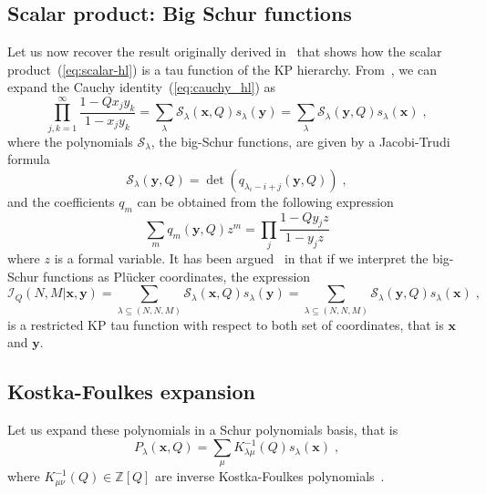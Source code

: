 \documentclass[a4paper,11pt]{amsart}
\begin{document}

\subsection{Scalar product: Big Schur functions}

Let us now recover the result originally derived
in~\cite{Foda:2008hn} that shows how the scalar
product~(\ref{eq:scalar-hl}) is a tau function of the KP hierarchy.
From~\cite[see chap.3, sec. 4, eq. (4.7)]{Macdonald:1998}, we can
expand the Cauchy identity~(\ref{eq:cauchy_hl}) as
\begin{equation}
 \prod_{j, k=1}^\infty \frac{1-Q x_j y_k}{1 - x_j y_k} = 
\sum_{\lambda} \mathcal{S}_{\lambda}(\bm{x}, Q) s_{\lambda}(\bm{y}) =
\sum_{\lambda} \mathcal{S}_{\lambda}(\bm{y}, Q) s_{\lambda}(\bm{x}) \; ,
\end{equation}
where the polynomials \(\mathcal{S}_\lambda\), the big-Schur
functions, are given by a Jacobi-Trudi formula
\begin{equation}
  \mathcal{S}_{\lambda} (\bm{y}, Q) = \det(q_{\lambda_i -i + j}(\bm{y}, Q))\; , 
\end{equation}
and the coefficients \(q_m\) can be obtained from the following expression
\begin{equation}
 \sum_{m} q_m(\bm{y}, Q) z^m =
 \prod_{j} \frac{1-Q y_j z}{1 - y_j z}
\end{equation}
where \(z\) is a formal variable. It has been
argued~\cite{Foda:2008hn} in that if we interpret the big-Schur
functions as Plücker coordinates, the expression
\begin{equation}
  \mathcal{I}_Q(N,M | \bm{x}, \bm{y})
  = \sum_{\lambda \subseteq (N,N,M)} \mathcal{S}_{\lambda}(\bm{x}, Q) s_{\lambda}(\bm{y})
  = \sum_{\lambda \subseteq (N,N,M)} \mathcal{S}_{\lambda}(\bm{y}, Q) s_{\lambda}(\bm{x})\; ,
\end{equation}
is a restricted KP tau function with respect to both set of coordinates,
that is \(\bm{x}\) and \(\bm{y}\).


\subsection{Kostka-Foulkes expansion}
Let us expand these polynomials in a Schur polynomials basis, that is
\begin{equation}
P_\lambda(\bm{x}, Q) = \sum_{\mu} K^{-1}_{\lambda \mu}(Q) s_\lambda(\bm{x})\; , 
\end{equation}
where \(K^{-1}_{\mu\nu}(Q) \in \mathbb{Z}[Q]\) are inverse
Kostka-Foulkes polynomials~\cite{Macdonald:1998, Wheeler:2018}.
\end{document}
